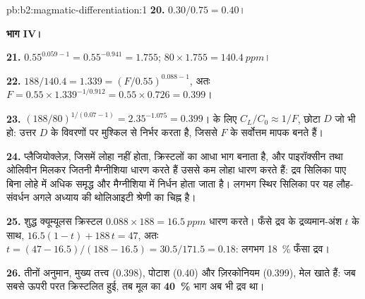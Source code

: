 \begin{solution}{pb:b2:magmatic-differentiation:1}
\textbf{20.} $0.30/0.75 = 0.40$।

\noindent\textbf{भाग IV।}

\textbf{21.} $0.55^{0.059 - 1} = 0.55^{-0.941} = 1.755$; $80\times1.755 =
\qty{140.4}{ppm}$।

\textbf{22.} $188/140.4 = 1.339 = (F/0.55)^{0.088 - 1}$, अतः $F = 0.55\times1.339^{-1/
0.912} = 0.55\times0.726 = 0.399$।

\textbf{23.} $(188/80)^{1/(0.07 - 1)} = 2.35^{-1.075} = 0.399$।  के लिए $C_L/C_0 \approx 1/F$, छोटा $D$ जो भी हो: उत्तर
$D$ के विवरणों पर मुश्किल से निर्भर करता है, जिससे  $F$ के सर्वोत्तम मापक बनते हैं।

\textbf{24.} प्लैजियोक्लेज़, जिसमें लोहा नहीं होता, क्रिस्टलों का आधा भाग बनाता है, और
पाइरॉक्सीन तथा ओलिवीन मिलकर जितनी मैग्नीशिया धारण करते हैं उससे कम लोहा धारण करते हैं: द्रव
सिलिका पाए बिना लोहे में अधिक समृद्ध और मैग्नीशिया
में निर्धन होता जाता है। लगभग स्थिर सिलिका पर
यह लौह-संवर्धन अगले अध्याय की थोलिआइटी श्रेणी का चिह्न है।

\textbf{25.} शुद्ध क्यूम्यूलस क्रिस्टल $0.088\times188 = \qty{16.5}{ppm}$ धारण करते। फँसे द्रव के
द्रव्यमान-अंश $t$ के साथ, $16.5(1 - t) + 188\,t = 47$, अतः $t = (47 -
16.5)/(188 - 16.5) = 30.5/171.5 = 0.18$: लगभग \qty{18}{\percent} फँसा द्रव।

\textbf{26.} तीनों अनुमान, मुख्य तत्त्व (0.398), पोटाश (0.40) और
ज़िरकोनियम (0.399), मेल खाते हैं: जब सबसे ऊपरी परत क्रिस्टलित हुई, तब
मूल  का \textbf{\qty[text-series-to-math=true]{40}{\percent}} भाग
अब भी द्रव था।
\end{solution}
